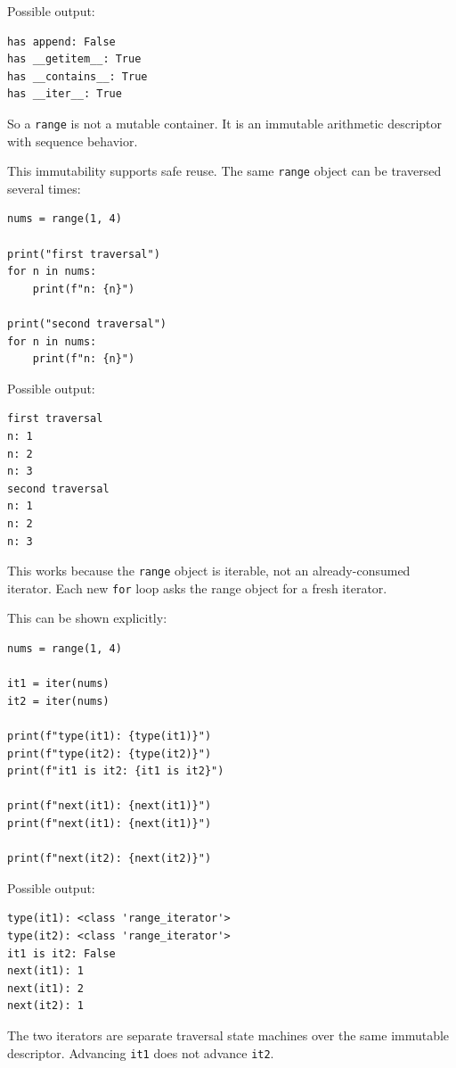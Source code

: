 Possible output:

\begin{verbatim}
has append: False
has __getitem__: True
has __contains__: True
has __iter__: True
\end{verbatim}

So a \texttt{range} is not a mutable container. It is an immutable arithmetic descriptor with sequence behavior.

This immutability supports safe reuse. The same \texttt{range} object can be traversed several times:

\begin{verbatim}
nums = range(1, 4)

print("first traversal")
for n in nums:
    print(f"n: {n}")

print("second traversal")
for n in nums:
    print(f"n: {n}")
\end{verbatim}

Possible output:

\begin{verbatim}
first traversal
n: 1
n: 2
n: 3
second traversal
n: 1
n: 2
n: 3
\end{verbatim}

This works because the \texttt{range} object is iterable, not an already-consumed iterator. Each new \texttt{for} loop asks the range object for a fresh iterator.

This can be shown explicitly:

\begin{verbatim}
nums = range(1, 4)

it1 = iter(nums)
it2 = iter(nums)

print(f"type(it1): {type(it1)}")
print(f"type(it2): {type(it2)}")
print(f"it1 is it2: {it1 is it2}")

print(f"next(it1): {next(it1)}")
print(f"next(it1): {next(it1)}")

print(f"next(it2): {next(it2)}")
\end{verbatim}

Possible output:

\begin{verbatim}
type(it1): <class 'range_iterator'>
type(it2): <class 'range_iterator'>
it1 is it2: False
next(it1): 1
next(it1): 2
next(it2): 1
\end{verbatim}

The two iterators are separate traversal state machines over the same immutable descriptor. Advancing \texttt{it1} does not advance \texttt{it2}.

